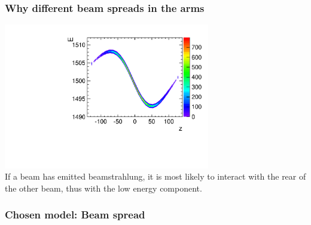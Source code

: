\documentclass[handout]{beamer}
\begin{document}
\begin{frame}
\frametitle{Why different beam spreads in the arms}
\centering
\includegraphics[width=9cm]{E_vs_v_colz_electrons}\\
If a beam has emitted beamstrahlung, it is most likely to interact with the rear
of the other beam, thus with the low energy component.
\end{frame}

\begin{frame}
\frametitle{Chosen model: Beam spread}
\end{frame}
\end{document}

